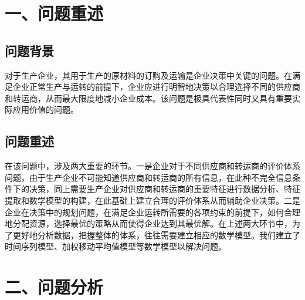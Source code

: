 \documentclass{my_paper}
\begin{document}
\newpage
\section{一、问题重述}

\iffalse
数学建模比赛论文是要我们解决一道给定的问题，所以正文部分一般应从问题重述开始，一般确定选题后就可以开始写这一部分了。这部分的内容是将原问题进行整理，将问题背景和题目分开陈述即可，所以基本没啥难度。本部分的目的是要吸引读者读下去，所以文字不可冗长，内容选择不要过于分散、琐碎，措辞要精练。
注意：在写这部分的内容时，绝对不可照抄原题！（论文会查重）
应为：在仔细理解了问题的基础上，用自己的语言重新将问题描述一遍。语言需要简明扼要，没有必要像原题一样面面俱到。
\fi 

\subsection{问题背景}
对于生产企业，其用于生产的原材料的订购及运输是企业决策中关键的问题。在满足企业正常生产与运转的前提下，企业应进行明智地决策以合理选择不同的供应商和转运商，从而最大限度地减小企业成本。该问题是极具代表性同时又具有重要实际应用价值的问题。

\subsection{问题重述}
在该问题中，涉及两大重要的环节。一是企业对于不同供应商和转运商的评价体系问题，由于生产企业不可能知道供应商和转运商的所有信息，在此种不完全信息条件下的决策，同上需要生产企业对供应商和转运商的重要特征进行数据分析、特征提取和数学模型的构建，在此基础上建立合理的评价体系从而辅助企业决策。二是企业在决策中的规划问题，在满足企业运转所需要的各项约束的前提下，如何合理地分配资源，选择最优的策略从而使得企业达到其最优解。在上述两大环节中，为了更好地分析数据，把握整体的体系，往往需要建立相应的数学模型。我们建立了时间序列模型、加权移动平均值模型等数学模型以解决问题。

\section{二、问题分析}

\iffalse
从实际问题到模型建立是一种从具体到抽象的思维过程，问题分析这一部分就是沟通这一过程的桥梁，因为它反映了建模者对于问题的认识程度如何，也体现了解决问题的雏形，起着承上启下的作用，也很能反应出建模者的综合水平。这部分的内容应包括：题目中包含的信息和条件，利用信息和条件对题目做整体分析，确定用什么方法建立模型，一般是每个问题单独分析一小节，分析过程要简明扼要， 不需要放结论。建议在文字说明的同时用图形或图表（例如流程图）列出思维过程，这会使你的思维显得很清晰，让人觉得一目了然。（注意：问题分析这一部分放置的位置比较灵活，可以放在问题重述后面作为单独的一节(见到的频率最高)，也可以放在模型假设和符号说明后面作为单独的一节，还可以针对每个问题将其写在模型建立中。）
\fi
\end{document}
